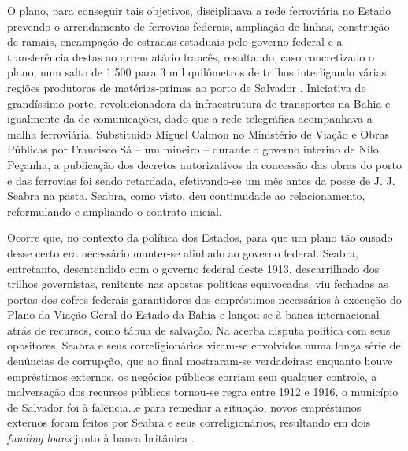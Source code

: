 O plano, para conseguir tais objetivos, disciplinava a rede ferroviária no Estado prevendo o arrendamento de ferrovias federais, ampliação de linhas, construção de ramais, encampação de estradas estaduais pelo governo federal e a transferência destas ao arrendatário francês, resultando, caso concretizado o plano, num salto de 1.500 para 3 mil quilômetros de trilhos interligando várias regiões produtoras de matérias-primas ao porto de Salvador \cite[pp.~217]{joaci_porto_2016}. Iniciativa de grandíssimo porte, revolucionadora da infraestrutura de transportes na Bahia e igualmente da de comunicações, dado que a rede telegráfica acompanhava a malha ferroviária. Substituído Miguel Calmon no Ministério de Viação e Obras Públicas por Francisco Sá -- um mineiro --  durante o governo interino de Nilo Peçanha, a publicação dos decretos autorizativos da concessão das obras do porto e das ferrovias foi sendo retardada, efetivando-se um mês antes da posse de J. J. Seabra na pasta. Seabra, como visto, deu continuidade ao relacionamento, reformulando e ampliando o contrato inicial.

Ocorre que, no contexto da política dos Estados, para que um plano tão ousado desse certo era necessário manter-se alinhado ao governo federal. Seabra, entretanto, desentendido com o governo federal deste 1913, descarrilhado dos trilhos governistas, renitente nas apostas políticas equivocadas, viu fechadas as portas dos cofres federais garantidores dos empréstimos necessários à execução do Plano da Viação Geral do Estado da Bahia e lançou-se à banca internacional atrás de recursos, como tábua de salvação. Na acerba disputa política com seus opositores, Seabra e seus correligionários viram-se envolvidos numa longa série de denúncias de corrupção, que ao final mostraram-se verdadeiras: enquanto houve empréstimos externos, os negócios públicos corriam sem qualquer controle, a malversação dos recursos públicos tornou-se regra entre 1912 e 1916, o município de Salvador foi à falência\dots e para remediar a situação, novos empréstimos externos foram feitos por Seabra e seus correligionários, resultando em dois \textit{funding loans} junto à banca britânica \cite[pp.~217-221]{joaci_porto_2016}.

